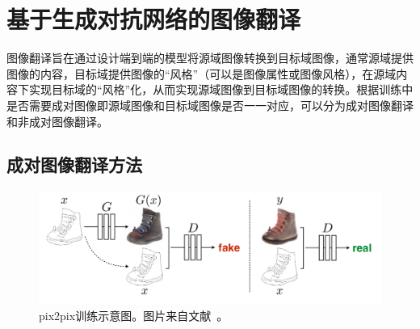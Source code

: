 




\section{基于生成对抗网络的图像翻译}
图像翻译旨在通过设计端到端的模型将源域图像转换到目标域图像，通常源域提供图像的内容，目标域提供图像的“风格”（可以是图像属性或图像风格），在源域内容下实现目标域的“风格”化，从而实现源域图像到目标域图像的转换。根据训练中是否需要成对图像即源域图像和目标域图像是否一一对应，可以分为成对图像翻译和非成对图像翻译。


\subsection{成对图像翻译方法}
\begin{figure}[htp]
    \centering
	\includegraphics[width=\textwidth]{figures/pix2pix.pdf}
	\caption{pix2pix训练示意图。图片来自文献~\cite{isola2017image}。}
	\label{fig:pix2pix}
\end{figure}

